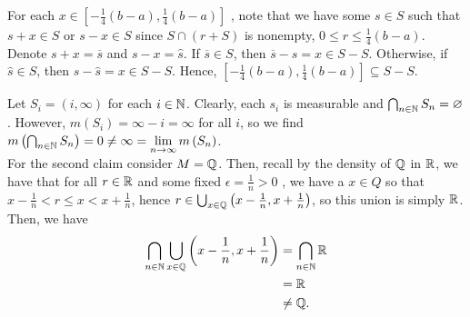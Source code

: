\documentclass[a4paper]{article}
\begin{document}
\begin{solution}[22]
\begin{enumerate}
	For each \(x \in \left[ -\frac{1}{4}\left( b-a \right) , \frac{1}{4}\left( b-a \right)   \right] \) , note that we have some \(s \in S\) such that \(s + x \in S \) or \(s - x \in S\) since \(S \cap \left( r + S \right) \) is nonempty, \(0 \le r \le \frac{1}{4}\left( b-a \right) \). Denote \(s + x = \overline{s}\) and \(s - x = \hat{s}\). If \(\overline{s} \in S\), then \(\overline{s} - s = x \in S - S\). Otherwise, if \(\hat{s} \in S\), then \(s - \hat{s} = x \in S - S\). Hence, \(\left[ -\frac{1}{4} \left( b-a \right) , \frac{1}{4}\left( b-a \right) \right] \subseteq S - S\).
\end{enumerate}
\end{solution}
\newpage
\begin{solution}[23]
\end{solution}
\newpage
\begin{solution}[24]
\end{solution}
\newpage
\begin{solution}[25]

\end{solution}
\newpage
\begin{solution}[26]
	Let \(S_{i} = \left( i, \infty \right) \) for each \(i \in \mathbb{N}\). Clearly, each \(s_{i}\) is measurable and \(\bigcap_{n \in \mathbb{N}} S_{n} = \varnothing\). However, \(m\left( S_{i} \right) = \infty - i = \infty  \) for all \(i\), so we find \(m\left( \bigcap_{n \in \N} S_{n} \right) = 0 \neq \infty = \lim_{n \to \infty}m\left( S_{n} \right)  \).\\
	For the second claim consider \(M = \mathbb{Q}\). Then, recall by the density of \(\mathbb{Q}\) in \(\mathbb{R}\), we have that for all \(r \in \mathbb{R}\) and some fixed \(\epsilon = \frac{1}{n}> 0\) , we have a \(x \in Q\) so that \(x - \frac{1}{n} < r \le x < x + \frac{1}{n}\), hence   \(r \in \bigcup_{x \in \mathbb{Q}} \left(x-\frac{1}{n}, x + \frac{1}{n} \right) \), so this union is simply \(\mathbb{R}\). Then, we have
	\begin{align*}
		\bigcap_{n \in \mathbb{N}} \bigcup_{x \in \mathbb{Q}} \left( x-\frac{1}{n}, x+\frac{1}{n} \right) &= \bigcap_{n \in \mathbb{N}} \mathbb{R} \\
		&= \mathbb{R} \\
		&\neq \mathbb{Q}
	.\end{align*}

\end{solution}
\newpage
\end{document}
